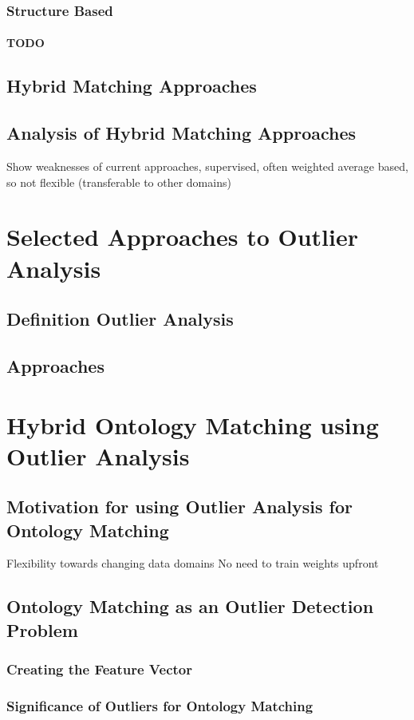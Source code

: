 \documentclass[11pt,titlepage,oneside,openany,a4paper]{report}
\begin{document}
\subsection{Structure Based}
 \subsubsection{TODO}
\section{Hybrid Matching Approaches}
\section{Analysis of Hybrid Matching Approaches}
Show weaknesses of current approaches, supervised, often weighted average based, so not flexible (transferable to other domains)

\chapter{Selected Approaches to Outlier Analysis}
\section{Definition Outlier Analysis}
\section{Approaches}


\chapter{Hybrid Ontology Matching using Outlier Analysis}
\section{Motivation for using Outlier Analysis for Ontology Matching}
Flexibility towards changing data domains
No need to train weights upfront
\section{Ontology Matching as an Outlier Detection Problem}
\subsection{Creating the Feature Vector}
\subsection{Significance of Outliers for Ontology Matching}
\end{document}
